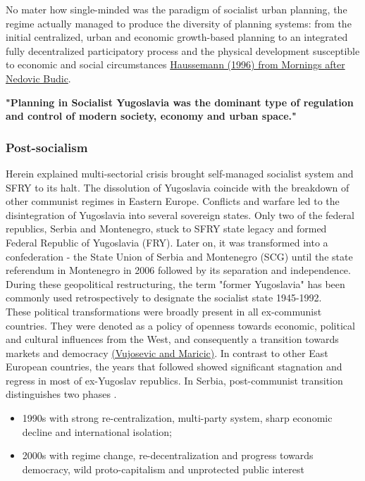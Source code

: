 \documentclass[11pt]{report}
\begin{document}
No mater how single-minded was the  paradigm of socialist urban planning, the regime actually managed to produce the diversity of planning systems: from the initial centralized, urban and economic growth-based planning to an integrated fully decentralized participatory process and the physical development susceptible to economic and social circumstances \href{}{Haussemann (1996) from Mornings after Nedovic Budic}.

\textbf{"Planning  in  Socialist  Yugoslavia  was  the  dominant  type  of  regulation  and  control  of  modern  society, economy and urban space." \href{}{\citealt{vukmirovic_city_2013}}}

\subsubsection{Post-socialism}

Herein explained multi-sectorial crisis brought self-managed socialist system and SFRY to its halt. The dissolution of Yugoslavia coincide with the breakdown of other communist regimes in Eastern Europe. Conflicts and warfare led to the disintegration of Yugoslavia into several sovereign states. Only two of the federal republics, Serbia and Montenegro, stuck to SFRY state legacy and formed Federal Republic of Yugoslavia (FRY). Later on, it was transformed into a confederation - the State Union of Serbia and Montenegro (SCG) until the state referendum in Montenegro in 2006 followed by its separation and independence. During these geopolitical restructuring, the term "former Yugoslavia" has been commonly used retrospectively to designate the socialist state 1945-1992.
\\

These political transformations were broadly present in all ex-communist countries. They were denoted as a policy of openness towards economic, political and cultural influences from the West, and consequently a transition towards markets and democracy \href{}{(Vujosevic and Maricic)}. In contrast to other East European countries, the years that followed showed significant stagnation and regress in most of ex-Yugoslav republics. In Serbia, post-communist transition distinguishes two phases \href{}{\citealt{nedovic-budic_mornings_2011}} .

\begin{itemize}
\item 1990s with strong re-centralization, multi-party system, sharp economic decline and international isolation;
\item 2000s with regime change, re-decentralization and progress towards democracy, wild proto-capitalism and unprotected public interest
\end{itemize}       
     
\end{document}
